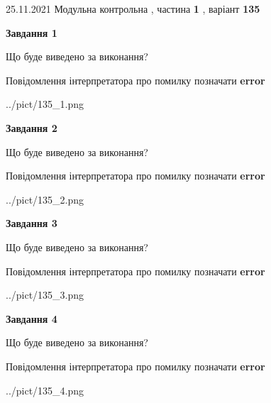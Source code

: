 \documentclass[10pt, ukrainian]{article}
\begin{document}
{25.11.2021 Модульна контрольна , частина \textbf { 1 }, варіант  \No \textbf { 135 }\par}
{
\begin {large}

{\begin {center}\textbf{Завдання 1}\end {center}}\par
Що буде виведено за виконання? \par
Повідомлення інтерпретатора про помилку позначати \textbf{error}

\begin{center}
	{../pict/135_1.png}
\end{center}
\newpage

{\begin {center}\textbf{Завдання 2}\end {center}}\par
Що буде виведено за виконання? \par
Повідомлення інтерпретатора про помилку позначати \textbf{error}

\begin{center}
	{../pict/135_2.png}
\end{center}
\newpage

{\begin {center}\textbf{Завдання 3}\end {center}}\par
Що буде виведено за виконання? \par
Повідомлення інтерпретатора про помилку позначати \textbf{error}

\begin{center}
	{../pict/135_3.png}
\end{center}
\newpage

{\begin {center}\textbf{Завдання 4}\end {center}}\par
Що буде виведено за виконання? \par
Повідомлення інтерпретатора про помилку позначати \textbf{error}

\begin{center}
	{../pict/135_4.png}
\end{center}
\newpage


\end{large}}
\end{document}
